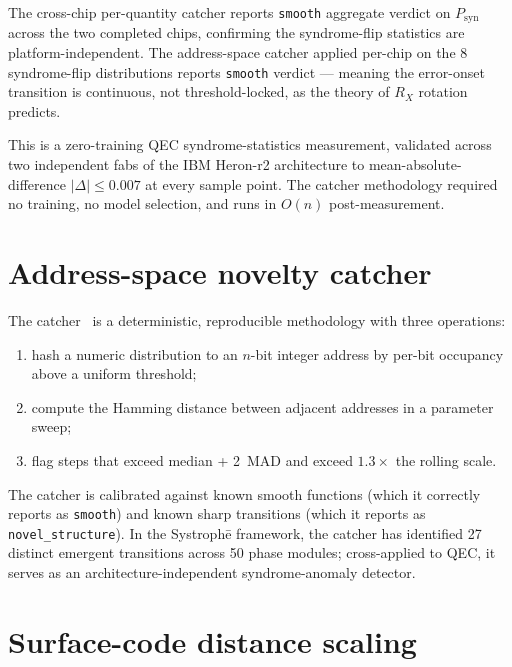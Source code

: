 \documentclass[11pt,a4paper]{article}
\begin{document}
The cross-chip per-quantity catcher reports \texttt{smooth} aggregate verdict on $P_\mathrm{syn}$ across the two completed chips, confirming the syndrome-flip statistics are platform-independent. The address-space catcher applied per-chip on the 8 syndrome-flip distributions reports \texttt{smooth} verdict --- meaning the error-onset transition is continuous, not threshold-locked, as the theory of $R_X$ rotation predicts.

This is a zero-training QEC syndrome-statistics measurement, validated across two independent fabs of the IBM Heron-r2 architecture to mean-absolute-difference $\lvert\Delta\rvert \le 0.007$ at every sample point. The catcher methodology required no training, no model selection, and runs in $O(n)$ post-measurement.

\section{Address-space novelty catcher}\label{sec:catcher}

The catcher~\cite{SystropheRepo} is a deterministic, reproducible methodology with three operations:
\begin{enumerate}[label=(\arabic*)]
\item hash a numeric distribution to an $n$-bit integer address by per-bit occupancy above a uniform threshold;
\item compute the Hamming distance between adjacent addresses in a parameter sweep;
\item flag steps that exceed median + 2~MAD and exceed $1.3\times$ the rolling scale.
\end{enumerate}
The catcher is calibrated against known smooth functions (which it correctly reports as \texttt{smooth}) and known sharp transitions (which it reports as \texttt{novel\_structure}). In the Systroph\=e framework, the catcher has identified 27 distinct emergent transitions across 50 phase modules; cross-applied to QEC, it serves as an architecture-independent syndrome-anomaly detector.

\section{Surface-code distance scaling}\label{sec:scalability}
\end{document}
